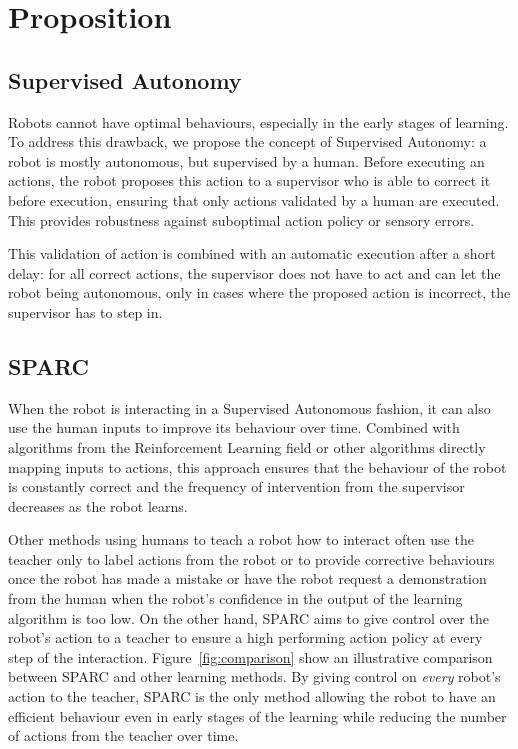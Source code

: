 \documentclass[conference]{IEEEtran}
\begin{document}
\section{Proposition}

\subsection{Supervised Autonomy}

Robots cannot have optimal behaviours, especially in the early stages of
learning. To address this drawback, we propose the concept of Supervised
Autonomy: a robot is mostly autonomous, but supervised by a human. Before
executing an actions, the robot proposes this action to a supervisor who is able
to correct it before execution, ensuring that only actions validated by a human
are executed. This provides robustness against suboptimal action policy or sensory
errors.

This validation of action is combined with an automatic execution after a short
delay: for all correct actions, the supervisor does not have to act and can let
the robot being autonomous, only in cases where the proposed action is
incorrect, the supervisor has to step in.

\subsection{SPARC}

When the robot is interacting in a Supervised Autonomous fashion, it can also
use the human inputs to improve its behaviour over time. Combined with
algorithms from the Reinforcement Learning field or other algorithms directly
mapping inputs to actions, this approach ensures that the behaviour of the robot
is constantly correct and the frequency of intervention from the supervisor
decreases as the robot learns.

Other methods using humans to teach a robot how to interact often use the
teacher only to label actions from the robot or to provide corrective behaviours
once the robot has made a mistake or have the robot request a demonstration from
the human when the robot's confidence in the output of the learning algorithm is too
low.  On the other hand, SPARC aims to give control over the robot's action to a
teacher to ensure a high performing action policy at every step of the
interaction.  Figure~\ref{fig:comparison} show an illustrative comparison
between SPARC and other learning methods. By giving control on \emph{every}
robot's action to the teacher, SPARC is the only method allowing the robot to
have an efficient behaviour even in early stages of the learning while reducing
the number of actions from the teacher over time.
\end{document}

